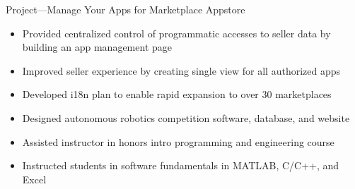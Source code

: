 \documentclass[11pt,letterpaper,ragged2e,withhyper]{altacv}
\newif\ifbubbles
\begin{document}
\begin{paracol}{2}
\ifbubbles
    \cvtag{TypeScript}
    \cvtag{Java}
    \cvtag{React}
    \cvtag{Redux}
    \cvtag{AWS}
    \cvtag{Jest}
    \cvtag{Enzyme}
    \cvtag{REST}
\fi

\divider

\par Project—Manage Your Apps for Marketplace Appstore
\smallskip
\begin{itemize}
    \item Provided centralized control of programmatic accesses to seller data by building an app management page
    \item Improved seller experience by creating single view for all authorized apps
    \item Developed i18n plan to enable rapid expansion to over 30 marketplaces
\end{itemize}

\ifbubbles
    \cvtag{TypeScript}
    \cvtag{Java}
    \cvtag{React}
    \cvtag{Redux}
    \cvtag{Jest}
    \cvtag{Enzyme}
    \cvtag{REST}
    \cvtag{i18next}
\fi

\divider

\begin{itemize}
    \item Designed autonomous robotics competition software, database, and website
    \item Assisted instructor in honors intro programming and engineering course
    \item Instructed students in software fundamentals in MATLAB, C/C++, and Excel
\end{itemize}

\ifbubbles
    \cvtag{Education}
    \cvtag{C}
    \cvtag{C++}
    \cvtag{MATLAB}
    \cvtag{Excel}
    \cvtag{C\#}
    \cvtag{ASP.NET}
    \cvtag{SQL}
\fi




\end{paracol}
\end{document}
